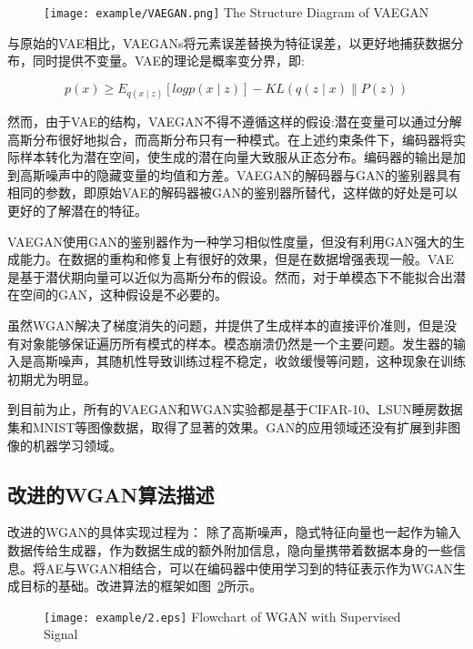 \begin{figure}[!htp]
	\centering
	\texttt{[image: example/VAEGAN.png]}
	{The Structure Diagram of VAEGAN}
	\label{figVAEGAN}
\end{figure}

与原始的VAE相比，VAEGANs将元素误差替换为特征误差，以更好地捕获数据分布，同时提供不变量\cite{7}。VAE的理论是概率变分界\cite{16}，即:

\begin{equation}
\label{eq18}
p(x)\geq E_{q(x\mid z)}[log p (x\mid z)]- KL(q(z\mid x)\parallel P (z))
\end{equation}

然而，由于VAE的结构，VAEGAN不得不遵循这样的假设:潜在变量可以通过分解高斯分布很好地拟合，而高斯分布只有一种模式。在上述约束条件下，编码器将实际样本转化为潜在空间，使生成的潜在向量大致服从正态分布。编码器的输出是加到高斯噪声中的隐藏变量的均值和方差。VAEGAN的解码器与GAN的鉴别器具有相同的参数，即原始VAE的解码器被GAN的鉴别器所替代，这样做的好处是可以更好的了解潜在的特征。

VAEGAN使用GAN的鉴别器作为一种学习相似性度量，但没有利用GAN强大的生成能力。在数据的重构和修复上有很好的效果，但是在数据增强表现一般。VAE是基于潜伏期向量可以近似为高斯分布的假设。然而，对于单模态下不能拟合出潜在空间的GAN，这种假设是不必要的。

虽然WGAN解决了梯度消失的问题，并提供了生成样本的直接评价准则，但是没有对象能够保证遍历所有模式的样本。模态崩溃仍然是一个主要问题。发生器的输入是高斯噪声，其随机性导致训练过程不稳定，收敛缓慢\cite{17}等问题，这种现象在训练初期尤为明显。

到目前为止，所有的VAEGAN和WGAN实验都是基于CIFAR-10、LSUN睡房数据集和MNIST等图像数据，取得了显著的效果。GAN的应用领域还没有扩展到非图像的机器学习领域。

\subsection{改进的WGAN算法描述}
改进的WGAN的具体实现过程为：
除了高斯噪声，隐式特征向量也一起作为输入数据传给生成器，作为数据生成的额外附加信息，隐向量携带着数据本身的一些信息。将AE与WGAN相结合，可以在编码器中使用学习到的特征表示作为WGAN生成目标的基础。改进算法的框架如图~\ref{fig2}所示。

\begin{figure}[!htp]
	\centering
	\texttt{[image: example/2.eps]}
	{Flowchart of WGAN with Supervised Signal}
	\label{fig2}
\end{figure}

